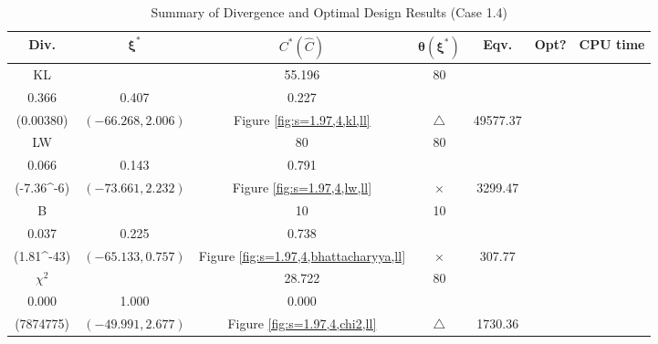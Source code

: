 \documentclass[12pt, a4paper]{article}
\begin{document}
\begin{table}[H]
\centering
\renewcommand{\arraystretch}{1.5} %
\setlength{\tabcolsep}{8pt} %
\begin{tabular}{|c|c|c|c|c|c|c|}
\hline
\textbf{Div.} & \(\boldsymbol{\xi^*}\) & \(C^* (\hat{C})\) & \(\boldsymbol{\hat{\theta}(\xi^*)}\) & \textbf{Eqv.} & \textbf{Opt?} & \textbf{CPU time} \\
\hline
KL & \(\left\{\begin{array}{ccc}
25.854 & 55.196 & 80 \\
0.366 & 0.407 & 0.227
\end{array}\right\}\) &
\(\begin{array}{c}
0.00385 \\
(0.00380)
\end{array}\) & 
\((-66.268, 2.006)\) & 
Figure \ref{fig:s=1.97,4,kl,ll} & $\triangle$ & 49577.37 \\
\hline
LW & \(\left\{\begin{array}{ccc}
80 & 80 & 80 \\
0.066 & 0.143 & 0.791
\end{array}\right\}\) &
\(\begin{array}{c}
0.693 \\
(-7.36\times 10^{-6})
\end{array}\) & 
\((-73.661, 2.232)\) & 
Figure \ref{fig:s=1.97,4,lw,ll} & $\times$ & 3299.47 \\
\hline
B & \(\left\{\begin{array}{ccc}
10 & 10 & 10 \\
0.037 & 0.225 & 0.738
\end{array}\right\}\) &
\(\begin{array}{c}
1.000 \\
(1.81\times 10^{-43})
\end{array}\) & 
\((-65.133, 0.757)\) & 
Figure \ref{fig:s=1.97,4,bhattacharyya,ll} & $\times$ & 307.77 \\
\hline
\(\chi^2\) & \(\left\{\begin{array}{ccc}
10.716 & 28.722 & 80 \\
0.000 & 1.000 & 0.000
\end{array}\right\}\) &
\(\begin{array}{c}
0.0229 \\
(7874775)
\end{array}\) & 
\((-49.991, 2.677)\) & 
Figure \ref{fig:s=1.97,4,chi2,ll} & $\triangle$ & 1730.36 \\
\hline
\end{tabular}
\caption{Summary of Divergence and Optimal Design Results (Case 1.4)}
\label{tab:results1.4}
\end{table}
\end{document}
